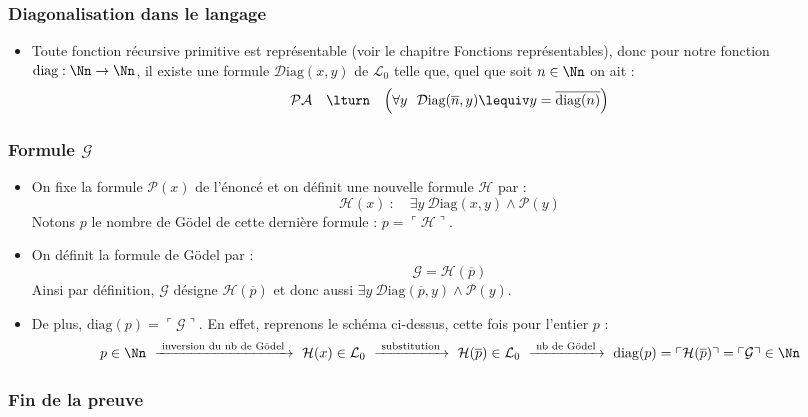 \documentclass[11pt,class=report,crop=false]{standalone}
\begin{document}
\subsubsection{Diagonalisation dans le langage}

\begin{itemize}
    \item Toute fonction récursive primitive est représentable (voir le chapitre \og{}Fonctions représentables\fg{}), donc pour notre fonction $\text{diag} : \Nn \to \Nn$, il existe une formule $\mathcal{D}\text{iag}(x,y)$ de $\mathcal{L}_0$ telle que, quel que soit $n \in \Nn$ on ait :
    \[ \mathcal{PA} \quad \lturn \quad \Big( \forall y \ \ \mathcal{D}\text{iag}(\overline{n},y) \lequiv y=\overline{\text{diag}(n)} \Big) \]
\end{itemize}

\subsubsection{Formule $\mathcal{G}$}

\begin{itemize}
    \item On fixe la formule $\mathcal{P}(x)$ de l'énoncé et on définit une nouvelle formule $\mathcal{H}$ par :
    \[ \mathcal{H}(x) \ : \quad \exists y \ \mathcal{D}\text{iag}(x,y) \land \mathcal{P}(y) \]
    Notons $p$ le nombre de Gödel de cette dernière formule : $p = \ulcorner \mathcal{H} \urcorner$.
    
    \item On définit la formule de Gödel par :
    \[ \mathcal{G} = \mathcal{H}(\overline{p}) \]
    Ainsi par définition, $\mathcal{G}$ désigne \og{}$\mathcal{H}(\overline{p})$\fg{} et donc aussi \og{}$\exists y \ \mathcal{D}\text{iag}(\overline{p},y) \land \mathcal{P}(y)$\fg{}.

    \item De plus, $\text{diag}(p) = \ulcorner \mathcal{G} \urcorner$. En effet, reprenons le schéma ci-dessus, cette fois pour l'entier $p$ :   
    \[ p \in \Nn \ \xrightarrow{\text{ inversion du nb de Gödel }} \ \mathcal{H}(x) \in \mathcal{L}_0 \ \xrightarrow{\text{ substitution }} \ \mathcal{H}(\overline{p}) \in \mathcal{L}_0 \ \xrightarrow{\text{ nb de Gödel }} \ \text{diag}(p) = \ulcorner \mathcal{H}(\overline{p}) \urcorner = \ulcorner \mathcal{G} \urcorner \in \Nn \]
\end{itemize}

\subsubsection{Fin de la preuve}
\end{document}
